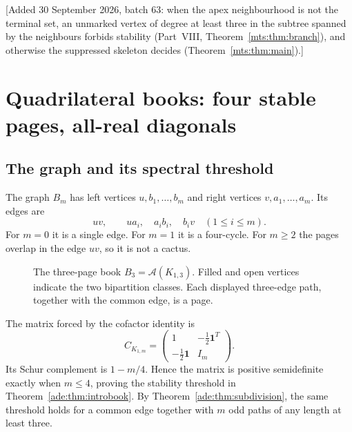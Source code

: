 \documentclass[11pt]{article}
\numberwithin{equation}{section}
\theoremstyle{definition}
\newcommand{\one}{\mathbf 1}
\newcommand{\calA}{\mathcal A}
\begin{document}
[Added 30 September 2026, batch 63: when the apex neighbourhood is not the
terminal set, an unmarked vertex of degree at least three in the subtree
spanned by the neighbours forbids stability (Part~VIII,
Theorem~\ref{mts:thm:branch}), and otherwise the suppressed skeleton decides
(Theorem~\ref{mts:thm:main}).]

\section{Quadrilateral books: four stable pages, all-real diagonals}
\label{ade:sec:books}

\subsection{The graph and its spectral threshold}

The graph $B_m$ has left vertices $u,b_1,\ldots,b_m$ and right vertices
$v,a_1,\ldots,a_m$.  Its edges are
\begin{equation}
 uv,\qquad ua_i,\quad a_ib_i,\quad b_iv\quad(1\le i\le m).
 \label{ade:eq:bookedges}
\end{equation}
For $m=0$ it is a single edge.  For $m=1$ it is a four-cycle.  For
$m\ge2$ the pages overlap in the edge $uv$, so it is not a cactus.

\begin{figure}[htbp]
\centering
{}
\caption{The three-page book $B_3=\calA(K_{1,3})$.
Filled and open vertices indicate the two bipartition classes.
Each displayed three-edge path, together with the common edge, is a page.}
\label{ade:fig:book}
\end{figure}

The matrix forced by the cofactor identity is
\begin{equation}
 C_{K_{1,m}}=
 \begin{pmatrix}
  1&-\tfrac12\one^T\\
  -\tfrac12\one&I_m
 \end{pmatrix}.
 \label{ade:eq:starC}
\end{equation}
Its Schur complement is $1-m/4$.  Hence the matrix is positive
semidefinite exactly when $m\le4$, proving the stability threshold in
Theorem~\ref{ade:thm:introbook}.  By Theorem~\ref{ade:thm:subdivision}, the same
threshold holds for a common edge together with $m$ odd paths of any
length at least three.
\end{document}

